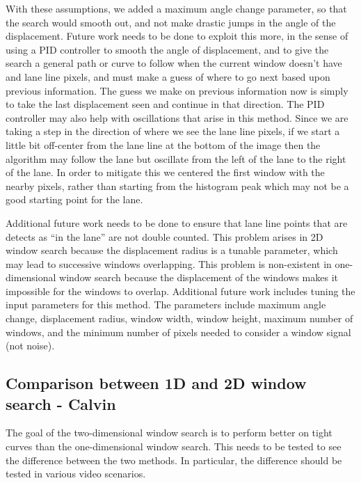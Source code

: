 \documentclass[twoside,twocolumn]{article}
\begin{document}
\par With these assumptions, we added a maximum angle change parameter, so that the search would smooth out, and not make drastic jumps in the angle of the displacement. Future work needs to be done to exploit this more, in the sense of using a PID controller to smooth the angle of displacement, and to give the search a general path or curve to follow when the current window doesn't have and lane line pixels, and must make a guess of where to go next based upon previous information. The guess we make on previous information now is simply to take the last displacement seen and continue in that direction. The PID controller may also help with oscillations that arise in this method. Since we are taking a step in the direction of where we see the lane line pixels, if we start a little bit off-center from the lane line at the bottom of the image then the algorithm may follow the lane but oscillate from the left of the lane to the right of the lane. In order to mitigate this we centered the first window with the nearby pixels, rather than starting from the histogram peak which may not be a good starting point for the lane.
\par Additional future work needs to be done to ensure that lane line points that are detects as “in the lane” are not double counted. This problem arises in 2D window search because the displacement radius is a tunable parameter, which may lead to successive windows overlapping. This problem is non-existent in one-dimensional window search because the displacement of the windows makes it impossible for the windows to overlap. Additional future work includes tuning the input parameters for this method. The parameters include maximum angle change, displacement radius, window width, window height, maximum number of windows, and the minimum number of pixels needed to consider a window signal (not noise).

\subsection{Comparison between 1D and 2D window search - Calvin}
\par The goal of the two-dimensional window search is to perform better on tight curves than the one-dimensional window search. This needs to be tested to see the difference between the two methods. In particular, the difference should be tested in various video scenarios.
\end{document}
